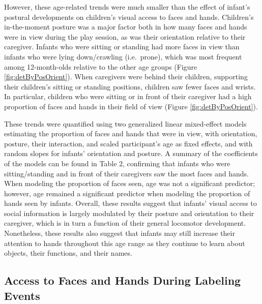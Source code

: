 \documentclass[english,man]{apa6}
\begin{document}
However, these age-related trends were much smaller than the effect of
infant's postural developments on children's visual access to faces and
hands. Children's in-the-moment posture was a major factor both in how
many faces and hands were in view during the play session, as was their
orientation relative to their caregiver. Infants who were sitting or
standing had more faces in view than infants who were lying
down/crawling (i.e.~prone), which was most frequent among 12-month-olds
relative to the other age groups (Figure \ref{fig:detByPosOrient}). When
caregivers were behind their children, supporting their children's
sitting or standing positions, children saw fewer faces and wrists. In
particular, children who were sitting or in front of their caregiver had
a high proportion of faces and hands in their field of view (Figure
\ref{fig:detByPosOrient}).

These trends were quantified using two generalized linear mixed-effect
models estimating the proportion of faces and hands that were in view,
with orientation, posture, their interaction, and scaled participant's
age as fixed effects, and with random slopes for infants' orientation
and posture. A summary of the coefficients of the models can be found in
Table 2, confirming that infants who were sitting/standing and in front
of their caregivers saw the most faces and hands. When modeling the
proportion of faces seen, age was not a significant predictor; however,
age remained a significant predictor when modeling the proportion of
hands seen by infants. Overall, these results suggest that infants'
visual access to social information is largely modulated by their
posture and orientation to their caregiver, which is in turn a function
of their general locomotor development. Nonetheless, these results also
suggest that infants may still increase their attention to hands
throughout this age range as they continue to learn about objects, their
functions, and their names.

\subsection{Access to Faces and Hands During Labeling
Events}\label{access-to-faces-and-hands-during-labeling-events}
\end{document}
